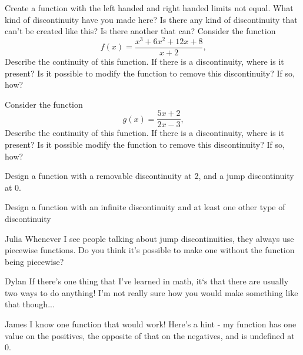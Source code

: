 \documentclass{ximera}
\begin{document}
\begin{question}
Create a function with the left handed and right handed limits not equal. What kind of discontinuity have you made here? Is there any kind of discontinuity that can't be created like this? Is there another that can?
Consider the function $$f(x) = \frac{x^3+6x^2+12x+8}{x+2} \text{,}$$ Describe the continuity of this function. If there is a discontinuity, where is it present? Is it possible to modify the function to remove this discontinuity? If so, how?
\begin{freeResponse}
\end{freeResponse}
\end{question}

\begin{question}
Consider the function $$g(x) = \frac{5x+2}{2x-3} \text{,}$$ Describe the continuity of this function. If there is a discontinuity, where is it present? Is it possible modify the function to remove this discontinuity? If so, how?
\begin{freeResponse}
\end{freeResponse}
\end{question}

\begin{question}
Design a function with a removable discontinuity at 2, and a jump discontinuity at 0.
\begin{freeResponse}
\end{freeResponse}
\end{question}

\begin{question}
Design a function with an infinite discontinuity and at least one other type of discontinuity
\begin{freeResponse}
\end{freeResponse}
\end{question}

\begin{dialogue}
\item[Julia] Whenever I see people talking about jump discontinuities, they always use piecewise functions. Do you think it's possible to make one without the function being piecewise?
\item[Dylan] If there's one thing that I've learned in math, it`s that there are usually two ways to do anything! I'm not really sure how you would make something like that though...
\item[James] I know one function that would work! Here's a hint - my function has one value on the positives, the opposite of that on the negatives, and is undefined at 0.
\end{dialogue}
\end{document}
